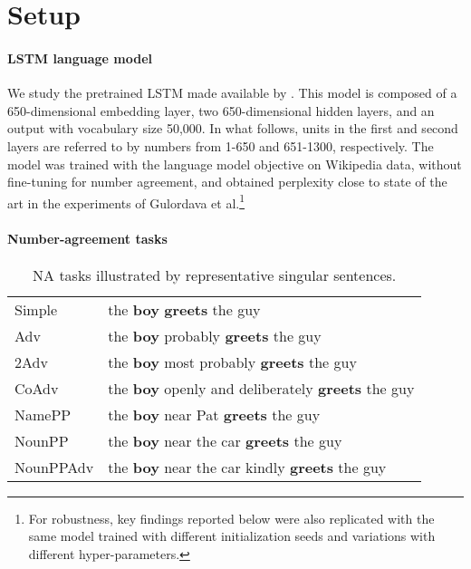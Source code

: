 \section{Setup}\label{sec:the_data}

\paragraph{LSTM language model}\label{ssec:lstm_lm}
We study the pretrained LSTM made available by
. This model is composed of a
650-dimensional embedding layer, two 650-dimensional hidden layers,
and an output with vocabulary size 50,000. In what follows, units in the first and second layers are referred to by numbers from 1-650 and 651-1300, respectively.
The model was trained with the language
model objective on Wikipedia data, without fine-tuning for number
agreement, and obtained perplexity close to state of the art in the experiments of Gulordava et al.\footnote{For robustness, key findings reported below were also replicated with the same model trained with different initialization seeds and variations with different hyper-parameters.} 


\paragraph{Number-agreement tasks}
\begin{table}[tb]
  \centering
  \begin{footnotesize}
  \begin{tabular}{l@{\hskip1pt}l}
    \B Simple & the \textbf{boy} \textbf{greets} the guy\\
    \B Adv & the \textbf{boy} probably \textbf{greets} the guy\\
    \B 2Adv & the \textbf{boy} most probably \textbf{greets} the guy\\
    \B CoAdv &  the \textbf{boy} openly and deliberately \textbf{greets} the guy\\
    \B NamePP & the \textbf{boy} near Pat \textbf{greets} the guy\\
    \B NounPP & the \textbf{boy} near the car \textbf{greets} the guy\\
    \B NounPPAdv & the \textbf{boy} near the car kindly \textbf{greets} the guy\\
  \end{tabular}
  \end{footnotesize}
  \caption{NA tasks illustrated by representative
    singular sentences.}
  \label{tab:data-sets}
\end{table}


